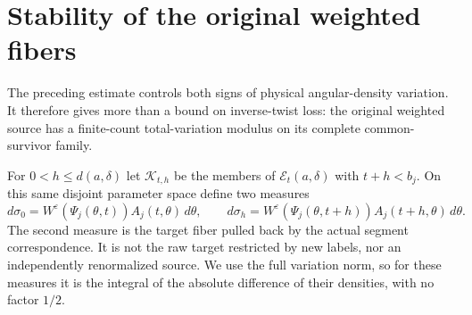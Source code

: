 \section{Stability of the original weighted fibers}
\label{sec:v88-fibers}
The preceding estimate controls both signs of physical angular-density
variation. It therefore gives more than a bound on inverse-twist loss:
the original weighted source has a finite-count total-variation modulus
on its complete common-survivor family.

For $0<h\le d(a,\delta)$ let $\mathcal K_{t,h}$ be the members of
$\mathcal E_t(a,\delta)$ with $t+h<b_j$. On this same disjoint
parameter space define two measures
\[
 d\sigma_0=W^\varepsilon(\Psi_j(\theta,t))A_j(t,\theta)\,d\theta,
 \qquad
 d\sigma_h=W^\varepsilon(\Psi_j(\theta,t+h))A_j(t+h,\theta)\,d\theta.
\]
The second measure is the target fiber pulled back by the actual
segment correspondence. It is not the raw target restricted by new
labels, nor an independently renormalized source. We use the full
variation norm, so for these measures it is the integral of the
absolute difference of their densities, with no factor $1/2$.

